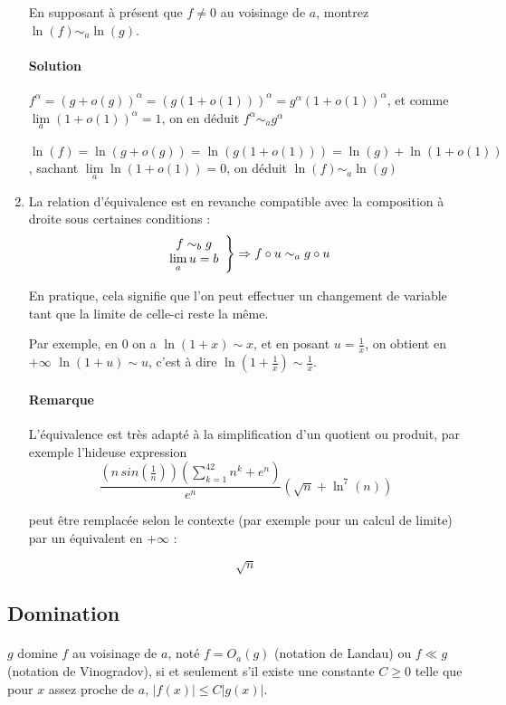 \documentclass[]{article}
\begin{document}
\begin{enumerate}
	En supposant à présent que $f \ne 0$ au voisinage de $a$, montrez $\ln(f) \sim_a \ln(g)$.
	
	\paragraph{Solution}
	$f^\alpha = (g+o(g))^\alpha = (g(1+o(1)))^\alpha=g^\alpha (1+o(1))^\alpha$, et comme $\lim\limits_{a} (1+o(1))^\alpha = 1$, on en déduit $f^\alpha \sim_a g^\alpha$
	
	$\ln(f)=\ln(g+o(g))=\ln(g(1+o(1)))=\ln(g)+\ln(1+o(1))$, sachant $\lim\limits_{a} \ln(1+o(1))=0$, on déduit $\ln(f) \sim_a \ln(g)$
	
	\item La relation d'équivalence est en revanche compatible avec la composition à droite sous certaines conditions :
		$$\left. \begin{array}{c c}
				f \sim_b g \\
				\lim\limits_{a} u=b\\
			\end{array} \right\} \Rightarrow f \circ u \sim_a g \circ u$$
	
	En pratique, cela signifie que l'on peut effectuer un changement de variable tant que la limite de celle-ci reste la même.
	
	Par exemple, en $0$ on a $\ln(1+x) \sim x$, et en posant $u=\frac{1}{x}$, on obtient en $+\infty$ $\ln(1+u)\sim u$, c'est à dire $\ln\left(1+\frac{1}{x}\right) \sim \frac{1}{x}$.
	
	\paragraph{Remarque}
	L'équivalence est très adapté à la simplification d'un quotient ou produit, par exemple l'hideuse expression
	$$\frac{\left(n \, sin \left(\frac{1}{n}\right)\right)\left(\displaystyle \sum_{k=1}^{42} n^k + e^n\right)}{e^{n}} \left(\sqrt{n} + \ln^7(n)\right)$$
	
	peut être remplacée selon le contexte (par exemple pour un calcul de limite) par un équivalent en $+\infty$ :
	
	$$\sqrt{n}$$
\end{enumerate}

\subsection{Domination}

\paragraph[Définition]{}
$g$ domine $f$ au voisinage de $a$, noté $f=O_a(g)$ (notation de Landau) ou $f \ll g$ (notation de Vinogradov), si et seulement s'il existe une constante $C \geqslant 0$ telle que pour $x$ assez proche de $a$, $|f(x)| \leqslant C|g(x)|$.
\end{document}
